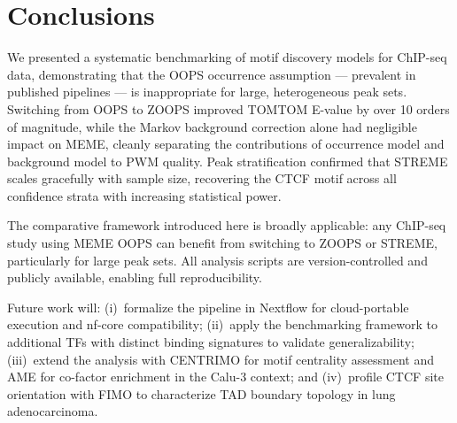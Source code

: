 \documentclass[12pt]{article}
\begin{document}
\section{Conclusions}

We presented a systematic benchmarking of motif discovery models for ChIP-seq
data, demonstrating that the OOPS occurrence assumption --- prevalent in published
pipelines --- is inappropriate for large, heterogeneous peak sets. Switching from
OOPS to ZOOPS improved TOMTOM E-value by over 10 orders of magnitude, while the
Markov background correction alone had negligible impact on MEME, cleanly
separating the contributions of occurrence model and background model to PWM
quality. Peak stratification confirmed that STREME scales gracefully with sample
size, recovering the CTCF motif across all confidence strata with increasing
statistical power.

The comparative framework introduced here is broadly applicable: any ChIP-seq
study using MEME OOPS can benefit from switching to ZOOPS or STREME, particularly
for large peak sets. All analysis scripts are version-controlled and publicly
available, enabling full reproducibility.

Future work will: (i)~formalize the pipeline in Nextflow for cloud-portable
execution and nf-core compatibility; (ii)~apply the benchmarking framework to
additional TFs with distinct binding signatures to validate generalizability;
(iii)~extend the analysis with CENTRIMO for motif centrality assessment and AME
for co-factor enrichment in the Calu-3 context; and (iv)~profile CTCF site
orientation with FIMO to characterize TAD boundary topology in lung adenocarcinoma.



\end{document}

